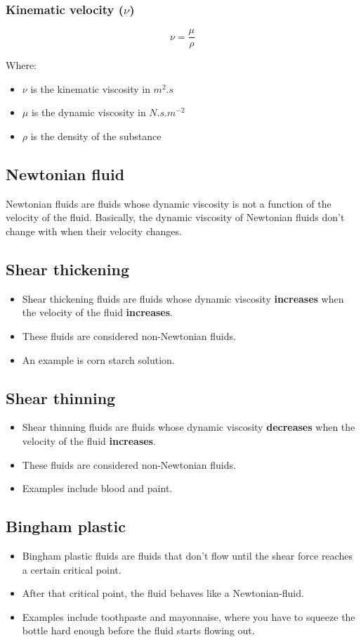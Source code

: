 \documentclass[11pt]{article}
\begin{document}
\subsubsection{Kinematic velocity (\(\nu\))}
\label{sec:orgd6f1e31}
\[\nu = \frac{\mu}{\rho}\]

Where:
\begin{itemize}
\item \(\nu\) is the kinematic viscosity in \(\unit{m^2.s}\)
\item \(\mu\) is the dynamic viscosity in \(\unit{N.s.m^{-2}}\)
\item \(\rho\) is the density of the substance
\end{itemize}
\subsection{Newtonian fluid}
\label{sec:orge109f5a}
Newtonian fluids are fluids whose dynamic viscosity is not a function of the velocity of the fluid. Basically, the dynamic viscosity of Newtonian fluids don't change with when their velocity changes.
\subsection{Shear thickening}
\label{sec:org09c4dff}
\begin{itemize}
\item Shear thickening fluids are fluids whose dynamic viscosity \textbf{increases} when the velocity of the fluid \textbf{increases}.
\item These fluids are considered non-Newtonian fluids.
\item An example is corn starch solution.
\end{itemize}
\subsection{Shear thinning}
\label{sec:org23efcbd}
\begin{itemize}
\item Shear thinning fluids are fluids whose dynamic viscosity \textbf{decreases} when the velocity of the fluid \textbf{increases}.
\item These fluids are considered non-Newtonian fluids.
\item Examples include blood and paint.
\end{itemize}
\subsection{Bingham plastic}
\label{sec:org1459ca2}
\begin{itemize}
\item Bingham plastic fluids are fluids that don't flow until the shear force reaches a certain critical point.
\item After that critical point, the fluid behaves like a Newtonian-fluid.
\item Examples include toothpaste and mayonnaise, where you have to squeeze the bottle hard enough before the fluid starts flowing out.
\end{itemize}
\end{document}
